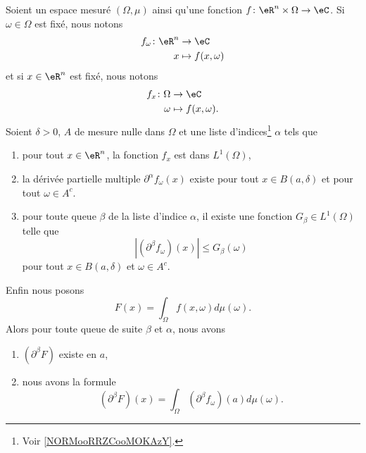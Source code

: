 \begin{proposition}     \label{PROPooJKXJooLxgEGd}
	Soient un espace mesuré \( (\Omega,\mu)\) ainsi qu'une fonction \( f\colon \eR^n\times \Omega\to \eC\). Si \( \omega\in \Omega\) est fixé, nous notons
	\begin{equation}
		\begin{aligned}
			f_{\omega}\colon \eR^n & \to \eC             \\
			x                      & \mapsto f(x,\omega)
		\end{aligned}
	\end{equation}
	et si \( x\in \eR^n\) est fixé, nous notons
	\begin{equation}
		\begin{aligned}
			f_x\colon \Omega & \to \eC              \\
			\omega           & \mapsto f(x,\omega).
		\end{aligned}
	\end{equation}
	Soient \( \delta>0\), \( A\) de mesure nulle dans \( \Omega\) et une liste d'indices\footnote{Voir \ref{NORMooRRZCooMOKAzY}.} \( \alpha\) tels que
	\begin{enumerate}
		\item
		      pour tout \( x\in \eR^n\), la fonction \( f_x\) est dans \( L^1(\Omega)\),
		\item
		      la dérivée partielle multiple \( \partial^{\alpha}f_{\omega}(x)\) existe pour tout \( x\in B(a,\delta)\) et pour tout \( \omega\in A^c\).
		\item pour toute queue \( \beta\) de la liste d'indice \( \alpha\), il existe une fonction \( G_{\beta}\in L^1(\Omega)\) telle que
		      \begin{equation}
			      | (\partial^{\beta}f_{\omega})(x) |\leq G_{\beta}(\omega)
		      \end{equation}
		      pour tout \( x\in B(a,\delta)\) et \( \omega\in A^{c}\).
	\end{enumerate}
	Enfin nous posons
	\begin{equation}
		F(x)=\int_{\Omega}f(x,\omega)d\mu(\omega).
	\end{equation}
	Alors pour toute queue de suite \( \beta\) et \( \alpha\), nous avons
	\begin{enumerate}
		\item
		      \( (\partial^{\beta}F)\) existe en \( a\),
		\item
		      nous avons la formule
		      \begin{equation}        \label{EQooTDDWooAcLRwX}
			      (\partial^{\beta}F)(x)=\int_{\Omega}(\partial^{\beta}f_{\omega})(a)d\mu(\omega).
		      \end{equation}
	\end{enumerate}
\end{proposition}

